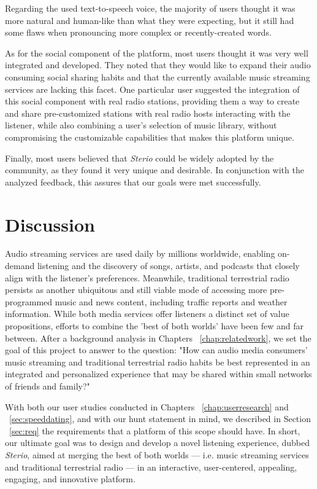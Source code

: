 {Regarding the used text-to-speech voice, the majority of users thought it was more natural and human-like than what they were expecting, but it still had some flaws when pronouncing more complex or recently-created words.

As for the social component of the platform, most users thought it was very well integrated and developed. They noted that they would like to expand their audio consuming social sharing habits and that the currently available music streaming services are lacking this facet. One particular user suggested the integration of this social component with real radio stations, providing them a way to create and share pre-customized stations with real radio hosts interacting with the listener, while also combining a user's selection of music library, without compromising the customizable capabilities that makes this platform unique.

Finally, most users believed that \textit{Sterio} could be widely adopted by the community, as they found it very unique and desirable. In conjunction with the analyzed feedback, this assures that our goals were met successfully.

\section{Discussion}

Audio streaming services are used daily by millions worldwide, enabling on-demand listening and the discovery of songs, artists, and podcasts that closely align with the listener’s preferences. Meanwhile, traditional terrestrial radio persists as another ubiquitous and still viable mode of accessing more pre-programmed music and news content, including traffic reports and weather information. While both media services offer listeners a distinct set of value propositions, efforts to combine the 'best of both worlds' have been few and far between. After a background analysis in Chapters ~\ref{chap:relatedwork}, we set the goal of this project to answer to the question: "How can audio media consumers' music streaming and traditional terrestrial radio habits be best represented in an integrated and personalized experience that may be shared within small networks of friends and family?"

With both our user studies conducted in Chapters ~\ref{chap:userresearch} and ~\ref{sec:speeddating}, and with our hunt statement in mind, we described in Section ~\ref{sec:req} the requirements that a platform of this scope should have. In short, our ultimate goal was to design and develop a novel listening experience, dubbed \textit{Sterio}, aimed at merging the best of both worlds — i.e. music streaming services and traditional terrestrial radio — in an interactive, user-centered, appealing, engaging, and innovative platform.

}

